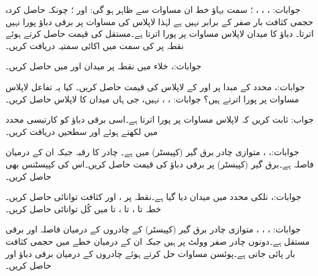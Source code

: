 جوابات: ، ،
 ، ؛ سمت بہاؤ خط ان مساوات سے ظاہر ہو گی:  اور ؛ چونکہ حاصل کردہ حجمی کثافت بار صفر کے برابر نہیں ہے لہٰذا لاپلاس کی مساوات پر برقی دباؤ پورا نہیں اترتا۔
دباؤ کا میدان  لاپلاس مساوات پر پورا اترتا ہے۔مستقل  کی قیمت حاصل کرتے ہوئے نقطہ  پر  کی سمت میں اکائی سمتیہ دریافت کریں۔

جوابات:، 
خلاء میں نقطہ  پر میدان  اور  میں  حاصل کریں۔

جوابات:، 
محدد کے مبدا  پر   اور  کے لاپلاس کی قیمت حاصل کریں۔ کیا یہ تفاعل لاپلاس مساوات پر پورا اترتے ہیں؟
جوابات: ، ، نہیں، جی ہاں
میدان  کا لاپلاس حاصل کریں۔

جواب: 
ثابت کریں کہ  لاپلاس مساوات پر پورا اترتا ہے۔اسی برقی دباؤ کو کارتیسی محدد میں لکھتے ہوئے  اور  سطحیں دریافت کریں۔

جوابات:، ، 
متوازی چادر برق گیر (کپیسٹر)  میں  ہے۔ چادر کا رقبہ  جبکہ ان کے درمیان فاصلہ  ہے۔برق گیر (کپیسٹر)  پر برقی دباؤ کی قیمت حاصل کریں۔اس کی کپیسٹنس بھی حاصل کریں۔

جوابات:، 
نلکی محدد میں میدان  دیا گیا ہے۔نقطہ  پر ،  اور کثافت توانائی حاصل کریں۔خطہ  تا ،  تا ،   تا  میں کُل توانائی حاصل کریں۔

جوابات: ، ، ،
متوازی چادر برق گیر (کپیسٹر)  کے چادروں کے درمیان فاصلہ  اور برقی مستقل  ہے۔دونوں چادر صفر وولٹ پر ہیں جبکہ ان کے درمیان خطے  میں حجمی کثافت بار  پائی جاتی ہے۔پوئسن  مساوات حل کرتے ہوئے چادروں کے درمیان برقی دباؤ اور  حاصل کریں۔

